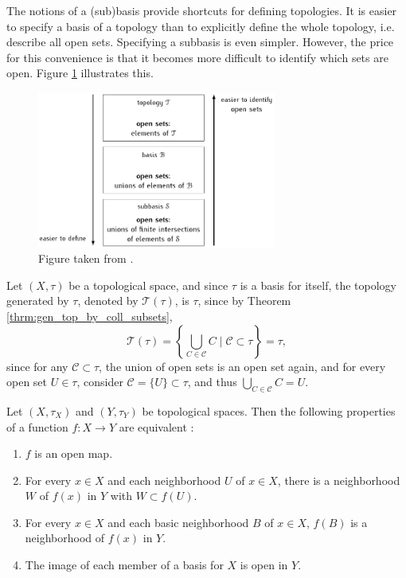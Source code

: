 \begin{remark}
	The notions of a (sub)basis provide shortcuts for defining topologies. It is easier to specify a basis of a topology than to explicitly define the whole topology, i.e. describe all open sets. Specifying a subbasis is even simpler. However, the price for this convenience is that it becomes more difficult to identify which sets are open. Figure \ref{fig:topology_sub_basis} illustrates this.
	\begin{figure}[h!]
		\centering 
		\includegraphics[width=0.7\textwidth]{Figures/topoly_(sub)basis.pdf}
		\caption{Figure taken from \cite{src:topology_sub_basis}.}
		\label{fig:topology_sub_basis}
	\end{figure}
\end{remark}

\begin{remark}\label{remark:topology_generated_by_topology}
	Let $(X, \tau)$ be a topological space, and since $\tau$ is a basis for itself, the topology generated by $\tau$, denoted by $\mathscr T(\tau)$, is $\tau$, since by Theorem \ref{thrm:gen_top_by_coll_subsets},
	$$\mathscr T(\tau) = \left\{ \bigcup_{C\in\mathscr C}C \mid \mathscr C \subset \tau \right\} = \tau,$$ since for any $\mathscr C\subset\tau$, the union of open sets is an open set again, and for every open set $U\in\tau$, consider $\mathscr C = \{U\}\subset \tau$, and thus $\bigcup_{C\in\mathscr C}C = U$.
\end{remark}

\begin{theorem}
	Let $(X, \tau_X)$ and $(Y, \tau_Y)$ be topological spaces. Then the following properties of a function $f: X\to Y$ are equivalent \cite{topology-singh}:
	\begin{enumerate}[label=(\alph*)]
		\item $f$ is an open map.
		\item For every $x\in X$ and each neighborhood $U$ of $x\in X$, there is a neighborhood $W$ of $f(x)$ in $Y$ with $W\subset f(U)$.
		\item For every $x\in X$ and each basic neighborhood $B$ of $x\in X$, $f(B)$ is a neighborhood of $f(x)$ in $Y$.
		\item The image of each member of a basis for $X$ is open in $Y$.
	\end{enumerate}
\end{theorem}

